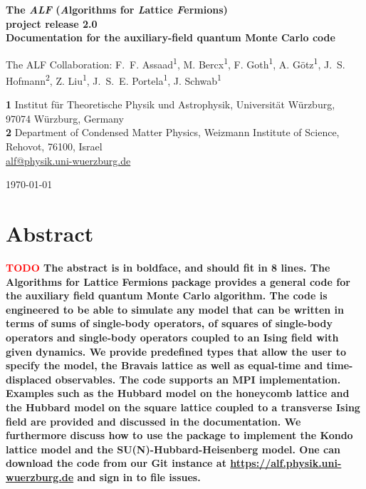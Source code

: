 \documentclass[submission, Phys]{SciPost}
\newcommand*{\red}{\textcolor{red}}
\begin{document}
	
\begin{center}{\Large \textbf{
The \emph{ALF} (\emph{A}lgorithms for \emph{L}attice \emph{F}ermions)\\project release 2.0\\
{\normalsize Documentation for the  auxiliary-field quantum Monte Carlo code}
}}\end{center}

\begin{center}
The ALF Collaboration: F.~F. Assaad\textsuperscript{1},
M. Bercx\textsuperscript{1},
F. Goth\textsuperscript{1},
A. G\"otz\textsuperscript{1},
J.~S. Hofmann\textsuperscript{2},
Z. Liu\textsuperscript{1},
J.~S.~E. Portela\textsuperscript{1},
J. Schwab\textsuperscript{1}
\end{center}

\begin{center}
{\bf 1} Institut f\"ur Theoretische Physik und Astrophysik, Universit\"at W\"urzburg,\\
97074 W\"urzburg, Germany\\
{\bf 2} Department of Condensed Matter Physics, Weizmann Institute of Science,\\
Rehovot, 76100, Israel
\\
\url{alf@physik.uni-wuerzburg.de}
\end{center}

\begin{center}
\today
\end{center}


\section*{Abstract}
{\bf
\red{ TODO } The abstract is in boldface, and should fit in 8 lines.
The Algorithms for Lattice Fermions package provides a general code for the auxiliary field quantum Monte Carlo algorithm. The code is engineered to be	able to simulate any model that can be written in terms of sums of single-body operators, of squares of single-body operators and single-body operators coupled to an Ising field with given dynamics. We provide predefined types that allow the user to specify the model, the Bravais lattice as well as equal-time and time-displaced observables. The code supports an MPI implementation. Examples such as the Hubbard model on the honeycomb lattice and the Hubbard model on the square lattice coupled to a transverse Ising field are provided and discussed in the documentation. We furthermore discuss how to use the package to implement the Kondo lattice model and the SU(N)-Hubbard-Heisenberg model. One can download the code from our Git instance at \url{https://alf.physik.uni-wuerzburg.de} and sign in to file issues.
}\\
\end{document}
